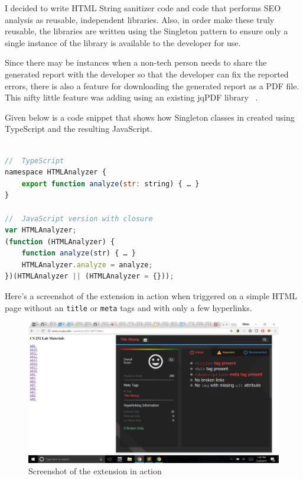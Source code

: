 \documentclass[14pt]{article}
\newcommand{\codeword}{\texttt}
\begin{document}
I decided to write HTML String sanitizer code and code that performs SEO analysis as reusable, independent libraries. Also, in order make these truly reusable, the libraries are written using the Singleton pattern to ensure only a single instance of the library is available to the developer for use.

Since there may be instances when a non-tech person needs to share the generated report with the developer so that the developer can fix the reported errors, there is also a feature for downloading the generated report as a PDF file. This nifty little feature was adding using an existing jqPDF library ~\cite{jqPDF}.

Given below is a code snippet that shows how Singleton classes in created using TypeScript and the resulting JavaScript.

\begin{lstlisting}[language=JavaScript, caption={TypeScript code for singleton pattern},captionpos=b, xleftmargin=.1\textwidth]

//  TypeScript
namespace HTMLAnalyzer {
    export function analyze(str: string) { … }
}

//  JavaScript version with closure
var HTMLAnalyzer;
(function (HTMLAnalyzer) {
    function analyze(str) { … }
    HTMLAnalyzer.analyze = analyze;
})(HTMLAnalyzer || (HTMLAnalyzer = {}));

\end{lstlisting}
\smallskip
\smallskip

Here's a screenshot of the extension in action when triggered on a simple HTML page without an \codeword{title} or \codeword{meta} tags and with only a few hyperlinks.

\begin{figure}[!ht]
\centering
\includegraphics[scale=0.22]{Screenshot}
\caption{Screenshot of the extension in action}
\end{figure}
\end{document}

